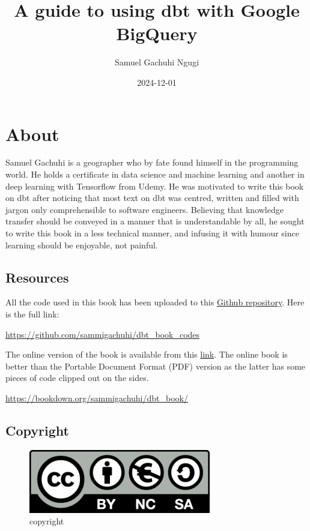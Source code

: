 \documentclass[
]{book}
\title{A guide to using dbt with Google BigQuery}
\author{Samuel Gachuhi Ngugi}
\date{2024-12-01}
\begin{document}
\maketitle

{
\setcounter{tocdepth}{1}
\tableofcontents
}
\hypertarget{about}{%
\chapter{About}\label{about}}

Samuel Gachuhi is a geographer who by fate found himself in the programming world. He holds a certificate in data science and machine learning and another in deep learning with Tensorflow from Udemy. He was motivated to write this book on dbt after noticing that most text on dbt was centred, written and filled with jargon only comprehensible to software engineers. Believing that knowledge transfer should be conveyed in a manner that is understandable by all, he sought to write this book in a less technical manner, and infusing it with humour since learning should be enjoyable, not painful.

\hypertarget{resources}{%
\section{Resources}\label{resources}}

All the code used in this book has been uploaded to this \href{https://github.com/sammigachuhi/dbt_book_codes}{Github repository}. Here is the full link:

\url{https://github.com/sammigachuhi/dbt_book_codes}

The online version of the book is available from this \href{https://bookdown.org/sammigachuhi/dbt_book/}{link}. The online book is better than the Portable Document Format (PDF) version as the latter has some pieces of code clipped out on the sides.

\url{https://bookdown.org/sammigachuhi/dbt_book/}

\hypertarget{copyright}{%
\section{Copyright}\label{copyright}}

\begin{figure}
\centering
\includegraphics{./images/copyright.png}
\caption{copyright}
\end{figure}
\end{document}
